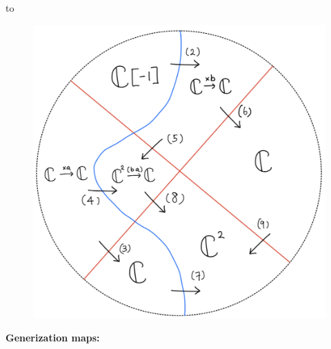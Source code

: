 to
\begin{figure}[H]
    \centering
    \includegraphics[scale = 0.95]{diagrams/lemma4/33.png}
    \caption{}
    \label{fig:your-label}
\end{figure}
\textbf{Generization maps:}
